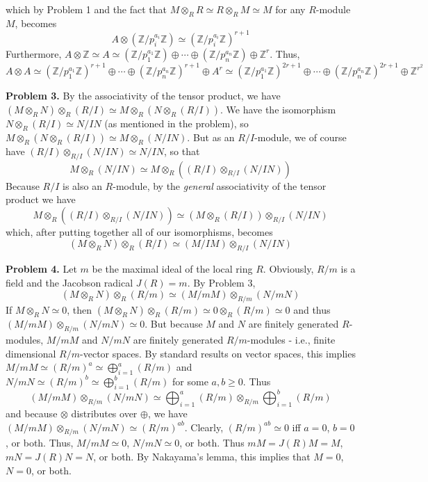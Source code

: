 \documentclass[11pt]{article}
\newcommand{\num}[1]{\noindent \textbf{#1}}
\newcommand{\Z}{\mathbb{Z}}
\theoremstyle{definition}
\begin{document}
which by Problem 1 and the fact that $M\otimes_RR\simeq
R\otimes_RM\simeq M$ for any $R$-module $M$, becomes
\[A\otimes(\Z/p_i^{a_i}\Z)\simeq(\mathbb{Z}/p_i^{a_i}\mathbb{Z})^{r+1}\]
Furthermore, $A\otimes\Z\simeq
A\simeq(\mathbb{Z}/p_1^{a_1}\mathbb{Z})\oplus\cdots\oplus(\mathbb{Z}/p_n^{a_n}\mathbb{Z})\oplus\mathbb{Z}^r$.
Thus, 
\[A\otimes A\simeq
(\Z/p_1^{a_1}\Z)^{r+1}\oplus\cdots\oplus(\Z/p_n^{a_n}\Z)^{r+1}\oplus
A^r\simeq(\Z/p_1^{a_1}\Z)^{2r+1}\oplus\cdots\oplus(\Z/p_n^{a_n}\Z)^{2r+1}\oplus
\Z^{r^2}\]

\num{Problem 3.} By the associativity of the tensor product, we have
$(M\otimes_R N)\otimes_R(R/I)\simeq M\otimes_R(N\otimes_R (R/I))$. We have
the isomorphism $N\otimes_R(R/I)\simeq N/IN$ (as mentioned in the problem), so
$M\otimes_R(N\otimes_R (R/I))\simeq M\otimes_R(N/IN)$. But as an $R/I$-module,
we of course have $(R/I)\otimes_{R/I}(N/IN)\simeq N/IN$, so that 
\[M\otimes_R(N/IN)\simeq M\otimes_R((R/I)\otimes_{R/I}(N/IN))\] 
Because $R/I$ is also an $R$-module, by the \textit{general} associativity
of the tensor product we have
\[M\otimes_R((R/I)\otimes_{R/I}(N/IN))\simeq (M\otimes_R
(R/I))\otimes_{R/I}(N/IN)\]
which, after putting together all of our isomorphisms, becomes
\[(M\otimes_R N)\otimes_R(R/I)\simeq (M/IM)\otimes_{R/I}(N/IN)\]

\num{Problem 4.} Let $m$ be the maximal ideal of the local ring $R$. Obviously,
$R/m$ is a field and the Jacobson radical $J(R)=m$. By Problem 3, 
\[(M\otimes_RN)\otimes_R(R/m)\simeq (M/mM)\otimes_{R/m}(N/mN)\]
If $M\otimes_RN\simeq0$, then
$(M\otimes_RN)\otimes_R(R/m)\simeq0\otimes_R(R/m)\simeq 0$ and thus
$(M/mM)\otimes_{R/m}(N/mN)\simeq0$. But because $M$ and $N$ are finitely
generated $R$-modules, $M/mM$ and $N/mN$ are finitely generated $R/m$-modules -
i.e., finite dimensional $R/m$-vector spaces. By standard results on vector
spaces, this implies $M/mM\simeq (R/m)^a\simeq\bigoplus_{i=1}^a(R/m)$ and
$N/mN\simeq (R/m)^b\simeq\bigoplus_{i=1}^b(R/m)$ for some $a,b\geq0$. Thus 
\[(M/mM)\otimes_{R/m}(N/mN)\simeq
\bigoplus_{i=1}^a(R/m)\otimes_{R/m}\bigoplus_{i=1}^b(R/m)\]
and because $\otimes$ distributes over $\oplus$, we have
$(M/mM)\otimes_{R/m}(N/mN)\simeq (R/m)^{ab}$. Clearly, $(R/m)^{ab}\simeq0$
iff $a=0$, $b=0$, or both. Thus, $M/mM\simeq0$, $N/mN\simeq0$, or both. Thus
$mM=J(R)M=M$, $mN=J(R)N=N$, or both. By Nakayama's lemma, this implies that
$M=0$, $N=0$, or both.   \\
\end{document}
